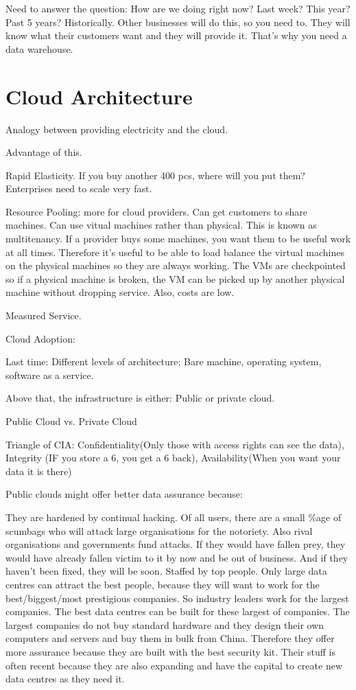 \documentclass[11pt]{article}
\begin{document}
Need to answer the question: How are we doing right now? Last week? This year? Past 5 years? Historically. Other businesses will do this, so you need to. They will know what their customers want and they will provide it. That’s why you need a data warehouse.



\section{Cloud Architecture}

Analogy between providing electricity and the cloud.

Advantage of this.

Rapid Elasticity. If you buy another 400 pcs, where will you put them? Enterprises need to scale very fast.

Resource Pooling: more for cloud providers. Can get customers to share machines. Can use vitual machines rather than physical. This is known as multitenancy. If a provider buys some machines, you want them to be useful work at all times. Therefore it’s useful to be able to load balance the virtual machines on the physical machines so they are always working. The VMs are checkpointed so if a physical machine is broken, the VM can be picked up by another physical machine without dropping service. Also, costs are low.

Measured Service.

Cloud Adoption:

Last time: Different levels of architecture: Bare machine, operating system, software as a service.

Above that, the infrastructure is either: Public or private cloud.

Public Cloud vs. Private Cloud

Triangle of CIA: Confidentiality(Only those with access rights can see the data), Integrity (IF you store a 6, you get a 6 back), Availability(When you want your data it is there)

Public clouds might offer better data assurance because:

They are hardened by continual hacking. Of all users, there are a small \%age of scumbags who will attack large organisations for the notoriety. Also rival organisations and governments fund attacks. If they would have fallen prey, they would have already fallen victim to it by now and be out of business. And if they haven’t been fixed, they will be soon.
Staffed by top people. Only large data centres can attract the best people, because they will want to work for the best/biggest/most prestigious companies. So industry leaders work for the largest companies.
The best data centres can be built for these largest of companies. The largest companies do not buy standard hardware and they design their own computers and servers and buy them in bulk from China. Therefore they offer more assurance because they are built with the best security kit. Their stuff is often recent because they are also expanding and have the capital to create new data centres as they need it.
\end{document}
